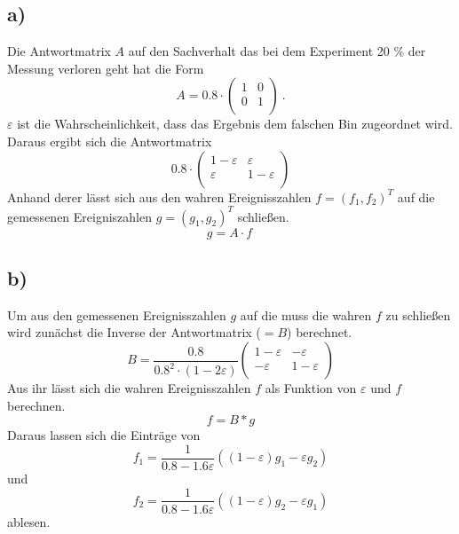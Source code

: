 \subsection*{a)}
Die Antwortmatrix $A$ auf den Sachverhalt das bei dem Experiment 20 \% der Messung verloren geht hat die Form
\begin{equation}
  A = 0.8 \cdot  
  \begin{pmatrix}
    1 & 0 \\
    0 & 1 \\
  \end{pmatrix} \ .
\end{equation}
$\varepsilon$ ist die Wahrscheinlichkeit, dass das Ergebnis dem falschen Bin zugeordnet wird. Daraus ergibt sich die Antwortmatrix
\begin{equation}
  0.8 \cdot
  \begin{pmatrix}
    1 - \varepsilon & \varepsilon \\
    \varepsilon & 1 - \varepsilon \\
  \end{pmatrix}
\end{equation}
Anhand derer lässt sich aus den wahren Ereignisszahlen $f = (f_1, f_2)^T$ auf die gemessenen Ereigniszahlen $g = (g_1,g_2)^T$ schließen.
\begin{equation}
  g = A \cdot f \ 
\end{equation}
\subsection*{b)}
Um aus den gemessenen Ereignisszahlen $g$ auf die muss die wahren $f$ zu schließen wird zunächst die Inverse der Antwortmatrix ($=B$) berechnet.
\begin{equation}
  B = \frac{0.8}{0.8^2 \cdot (1 - 2 \varepsilon)} 
  \begin{pmatrix}
    1 - \varepsilon & - \varepsilon \\
    - \varepsilon & 1 - \varepsilon \\
  \end{pmatrix}
\end{equation}
Aus ihr lässt sich die wahren Ereignisszahlen $f$ als Funktion von $\varepsilon$ und $f$ berechnen. 
\begin{equation}
  f = B * g
\end{equation}
Daraus lassen sich die Einträge von 
\begin{equation}
  f_1 = \frac{1}{0.8 - 1.6 \varepsilon} \left( (1 - \varepsilon) g_1 - \varepsilon g_2 \right)
\end{equation}
und 
\begin{equation}
  f_2 = \frac{1}{0.8 - 1.6 \varepsilon} \left( (1 - \varepsilon) g_2 - \varepsilon g_1 \right)
\end{equation} 
ablesen. 
